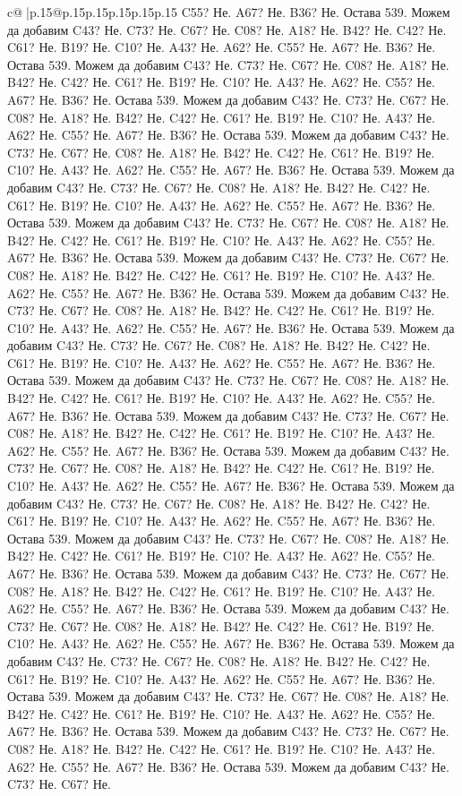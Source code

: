 \documentclass{article}
\begin{document}
{\begin{supertabular}{c@{$\;$}|p{.15\linewidth}@{}p{.15\linewidth}p{.15\linewidth}p{.15\linewidth}p{.15\linewidth}p{.15\linewidth}}
{{{C55? Не. A67? Не. B36? Не. Остава 539. Можем да добавим C43? Не. C73? Не. C67? Не. C08? Не. A18? Не. B42? Не. C42? Не. C61? Не. B19? Не. C10? Не. A43? Не. A62? Не. C55? Не. A67? Не. B36? Не. Остава 539. Можем да добавим C43? Не. C73? Не. C67? Не. C08? Не. A18? Не. B42? Не. C42? Не. C61? Не. B19? Не. C10? Не. A43? Не. A62? Не. C55? Не. A67? Не. B36? Не. Остава 539. Можем да добавим C43? Не. C73? Не. C67? Не. C08? Не. A18? Не. B42? Не. C42? Не. C61? Не. B19? Не. C10? Не. A43? Не. A62? Не. C55? Не. A67? Не. B36? Не. Остава 539. Можем да добавим C43? Не. C73? Не. C67? Не. C08? Не. A18? Не. B42? Не. C42? Не. C61? Не. B19? Не. C10? Не. A43? Не. A62? Не. C55? Не. A67? Не. B36? Не. Остава 539. Можем да добавим C43? Не. C73? Не. C67? Не. C08? Не. A18? Не. B42? Не. C42? Не. C61? Не. B19? Не. C10? Не. A43? Не. A62? Не. C55? Не. A67? Не. B36? Не. Остава 539. Можем да добавим C43? Не. C73? Не. C67? Не. C08? Не. A18? Не. B42? Не. C42? Не. C61? Не. B19? Не. C10? Не. A43? Не. A62? Не. C55? Не. A67? Не. B36? Не. Остава 539. Можем да добавим C43? Не. C73? Не. C67? Не. C08? Не. A18? Не. B42? Не. C42? Не. C61? Не. B19? Не. C10? Не. A43? Не. A62? Не. C55? Не. A67? Не. B36? Не. Остава 539. Можем да добавим C43? Не. C73? Не. C67? Не. C08? Не. A18? Не. B42? Не. C42? Не. C61? Не. B19? Не. C10? Не. A43? Не. A62? Не. C55? Не. A67? Не. B36? Не. Остава 539. Можем да добавим C43? Не. C73? Не. C67? Не. C08? Не. A18? Не. B42? Не. C42? Не. C61? Не. B19? Не. C10? Не. A43? Не. A62? Не. C55? Не. A67? Не. B36? Не. Остава 539. Можем да добавим C43? Не. C73? Не. C67? Не. C08? Не. A18? Не. B42? Не. C42? Не. C61? Не. B19? Не. C10? Не. A43? Не. A62? Не. C55? Не. A67? Не. B36? Не. Остава 539. Можем да добавим C43? Не. C73? Не. C67? Не. C08? Не. A18? Не. B42? Не. C42? Не. C61? Не. B19? Не. C10? Не. A43? Не. A62? Не. C55? Не. A67? Не. B36? Не. Остава 539. Можем да добавим C43? Не. C73? Не. C67? Не. C08? Не. A18? Не. B42? Не. C42? Не. C61? Не. B19? Не. C10? Не. A43? Не. A62? Не. C55? Не. A67? Не. B36? Не. Остава 539. Можем да добавим C43? Не. C73? Не. C67? Не. C08? Не. A18? Не. B42? Не. C42? Не. C61? Не. B19? Не. C10? Не. A43? Не. A62? Не. C55? Не. A67? Не. B36? Не. Остава 539. Можем да добавим C43? Не. C73? Не. C67? Не. C08? Не. A18? Не. B42? Не. C42? Не. C61? Не. B19? Не. C10? Не. A43? Не. A62? Не. C55? Не. A67? Не. B36? Не. Остава 539. Можем да добавим C43? Не. C73? Не. C67? Не. C08? Не. A18? Не. B42? Не. C42? Не. C61? Не. B19? Не. C10? Не. A43? Не. A62? Не. C55? Не. A67? Не. B36? Не. Остава 539. Можем да добавим C43? Не. C73? Не. C67? Не. C08? Не. A18? Не. B42? Не. C42? Не. C61? Не. B19? Не. C10? Не. A43? Не. A62? Не. C55? Не. A67? Не. B36? Не. Остава 539. Можем да добавим C43? Не. C73? Не. C67? Не. C08? Не. A18? Не. B42? Не. C42? Не. C61? Не. B19? Не. C10? Не. A43? Не. A62? Не. C55? Не. A67? Не. B36? Не. Остава 539. Можем да добавим C43? Не. C73? Не. C67? Не. C08? Не. A18? Не. B42? Не. C42? Не. C61? Не. B19? Не. C10? Не. A43? Не. A62? Не. C55? Не. A67? Не. B36? Не. Остава 539. Можем да добавим C43? Не. C73? Не. C67? Не. C08? Не. A18? Не. B42? Не. C42? Не. C61? Не. B19? Не. C10? Не. A43? Не. A62? Не. C55? Не. A67? Не. B36? Не. Остава 539. Можем да добавим C43? Не. C73? Не. C67? Не. }}}
\end{supertabular}}
\end{document}

